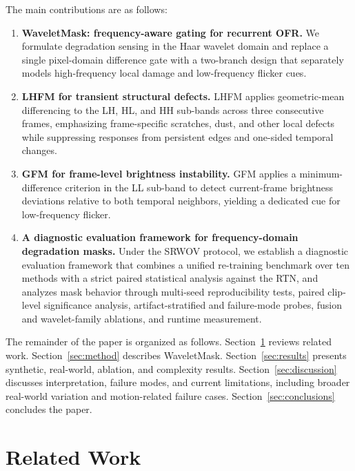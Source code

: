 \documentclass[applsci,article,submit,pdftex,moreauthors]{Definitions/mdpi}
\begin{document}
The main contributions are as follows:
\begin{enumerate}
    \item \textbf{WaveletMask: frequency-aware gating for recurrent OFR.} We formulate degradation sensing in the Haar wavelet domain and replace a single pixel-domain difference gate with a two-branch design that separately models high-frequency local damage and low-frequency flicker cues.

    \item \textbf{LHFM for transient structural defects.} LHFM applies geometric-mean differencing to the LH, HL, and HH sub-bands across three consecutive frames, emphasizing frame-specific scratches, dust, and other local defects while suppressing responses from persistent edges and one-sided temporal changes.

    \item \textbf{GFM for frame-level brightness instability.} GFM applies a minimum-difference criterion in the LL sub-band to detect current-frame brightness deviations relative to both temporal neighbors, yielding a dedicated cue for low-frequency flicker.

    \item \textbf{A diagnostic evaluation framework for frequency-domain degradation masks.} Under the SRWOV protocol, we establish a diagnostic evaluation framework that combines a unified re-training benchmark over ten methods with a strict paired statistical analysis against the RTN, and analyzes mask behavior through multi-seed reproducibility tests, paired clip-level significance analysis, artifact-stratified and failure-mode probes, fusion and wavelet-family ablations, and runtime measurement.
\end{enumerate}

The remainder of the paper is organized as follows. Section~\ref{sec:related_work} reviews related work. Section~\ref{sec:method} describes WaveletMask. Section~\ref{sec:results} presents synthetic, real-world, ablation, and complexity results. Section~\ref{sec:discussion} discusses interpretation, failure modes, and current limitations, including broader real-world variation and motion-related failure cases. Section~\ref{sec:conclusions} concludes the paper.

\section{Related Work}\label{sec:related_work}
\end{document}
